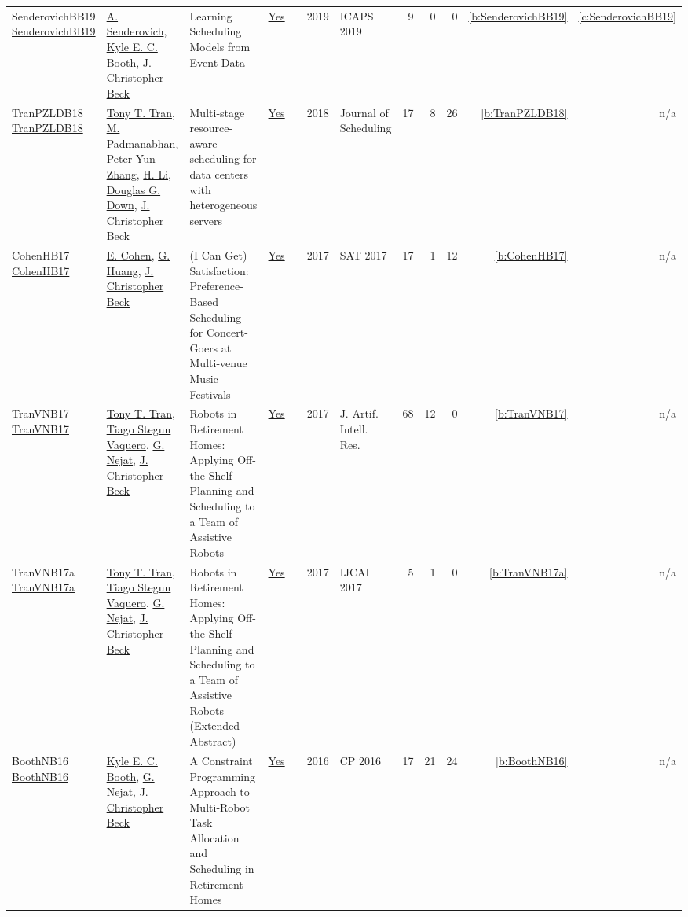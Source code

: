 {\begin{longtable}{>{\raggedright\arraybackslash}p{3cm}>{\raggedright\arraybackslash}p{6cm}>{\raggedright\arraybackslash}p{6.5cm}rrrp{2.5cm}rrrrr}
SenderovichBB19 \href{https://ojs.aaai.org/index.php/ICAPS/article/view/3504}{SenderovichBB19} & \hyperref[auth:a1396]{A. Senderovich}, \hyperref[auth:a208]{Kyle E. C. Booth}, \hyperref[auth:a89]{J. Christopher Beck} & Learning Scheduling Models from Event Data & \href{../works/SenderovichBB19.pdf}{Yes} & \cite{SenderovichBB19} & 2019 & ICAPS 2019 & 9 & 0 & 0 & \ref{b:SenderovichBB19} & \ref{c:SenderovichBB19}\\
TranPZLDB18 \href{https://doi.org/10.1007/s10951-017-0537-x}{TranPZLDB18} & \hyperref[auth:a805]{Tony T. Tran}, \hyperref[auth:a806]{M. Padmanabhan}, \hyperref[auth:a807]{Peter Yun Zhang}, \hyperref[auth:a808]{H. Li}, \hyperref[auth:a809]{Douglas G. Down}, \hyperref[auth:a89]{J. Christopher Beck} & Multi-stage resource-aware scheduling for data centers with heterogeneous servers & \href{../works/TranPZLDB18.pdf}{Yes} & \cite{TranPZLDB18} & 2018 & Journal of Scheduling & 17 & 8 & 26 & \ref{b:TranPZLDB18} & n/a\\
CohenHB17 \href{https://doi.org/10.1007/978-3-319-66263-3_10}{CohenHB17} & \hyperref[auth:a811]{E. Cohen}, \hyperref[auth:a812]{G. Huang}, \hyperref[auth:a89]{J. Christopher Beck} & {(I} Can Get) Satisfaction: Preference-Based Scheduling for Concert-Goers at Multi-venue Music Festivals & \href{../works/CohenHB17.pdf}{Yes} & \cite{CohenHB17} & 2017 & SAT 2017 & 17 & 1 & 12 & \ref{b:CohenHB17} & n/a\\
TranVNB17 \href{https://doi.org/10.1613/jair.5306}{TranVNB17} & \hyperref[auth:a805]{Tony T. Tran}, \hyperref[auth:a810]{Tiago Stegun Vaquero}, \hyperref[auth:a209]{G. Nejat}, \hyperref[auth:a89]{J. Christopher Beck} & Robots in Retirement Homes: Applying Off-the-Shelf Planning and Scheduling to a Team of Assistive Robots & \href{../works/TranVNB17.pdf}{Yes} & \cite{TranVNB17} & 2017 & J. Artif. Intell. Res. & 68 & 12 & 0 & \ref{b:TranVNB17} & n/a\\
TranVNB17a \href{https://doi.org/10.24963/ijcai.2017/726}{TranVNB17a} & \hyperref[auth:a805]{Tony T. Tran}, \hyperref[auth:a810]{Tiago Stegun Vaquero}, \hyperref[auth:a209]{G. Nejat}, \hyperref[auth:a89]{J. Christopher Beck} & Robots in Retirement Homes: Applying Off-the-Shelf Planning and Scheduling to a Team of Assistive Robots (Extended Abstract) & \href{../works/TranVNB17a.pdf}{Yes} & \cite{TranVNB17a} & 2017 & IJCAI 2017 & 5 & 1 & 0 & \ref{b:TranVNB17a} & n/a\\
BoothNB16 \href{https://doi.org/10.1007/978-3-319-44953-1_34}{BoothNB16} & \hyperref[auth:a208]{Kyle E. C. Booth}, \hyperref[auth:a209]{G. Nejat}, \hyperref[auth:a89]{J. Christopher Beck} & A Constraint Programming Approach to Multi-Robot Task Allocation and Scheduling in Retirement Homes & \href{../works/BoothNB16.pdf}{Yes} & \cite{BoothNB16} & 2016 & CP 2016 & 17 & 21 & 24 & \ref{b:BoothNB16} & n/a\\

\end{longtable}}
